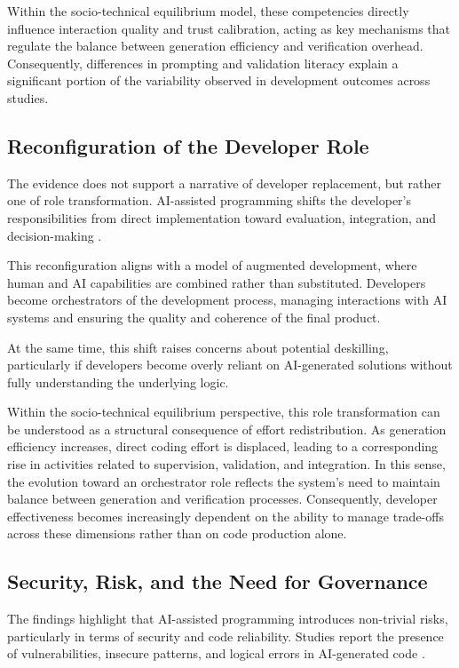 \documentclass[conference]{IEEEtran}
\begin{document}
Within the socio-technical equilibrium model, these competencies directly influence interaction quality and trust calibration, acting as key mechanisms that regulate the balance between generation efficiency and verification overhead. Consequently, differences in prompting and validation literacy explain a significant portion of the variability observed in development outcomes across studies.

\subsection{Reconfiguration of the Developer Role}

The evidence does not support a narrative of developer replacement, but rather one of role transformation. AI-assisted programming shifts the developer's responsibilities from direct implementation toward evaluation, integration, and decision-making \cite{koripalli_copilot_2025, kumar_intuition_2025}.

This reconfiguration aligns with a model of augmented development, where human and AI capabilities are combined rather than substituted. Developers become orchestrators of the development process, managing interactions with AI systems and ensuring the quality and coherence of the final product.

At the same time, this shift raises concerns about potential deskilling, particularly if developers become overly reliant on AI-generated solutions without fully understanding the underlying logic.

Within the socio-technical equilibrium perspective, this role transformation can be understood as a structural consequence of effort redistribution. As generation efficiency increases, direct coding effort is displaced, leading to a corresponding rise in activities related to supervision, validation, and integration. In this sense, the evolution toward an orchestrator role reflects the system's need to maintain balance between generation and verification processes. Consequently, developer effectiveness becomes increasingly dependent on the ability to manage trade-offs across these dimensions rather than on code production alone.

\subsection{Security, Risk, and the Need for Governance}

The findings highlight that AI-assisted programming introduces non-trivial risks, particularly in terms of security and code reliability. Studies report the presence of vulnerabilities, insecure patterns, and logical errors in AI-generated code \cite{sandoval_lost_2022}.
\end{document}

